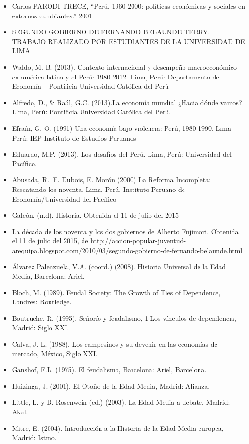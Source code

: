 \documentclass[
  letterpaper,
  DIV=11,
  numbers=noendperiod]{scrartcl}
\providecommand{\tightlist}{%
  \setlength{\itemsep}{0pt}\setlength{\parskip}{0pt}}\usepackage{longtable,booktabs,array}
\begin{document}
\begin{itemize}
\tightlist
\item
  Carlos PARODI TRECE, ``Perú, 1960-2000: políticas económicas y
  sociales en entornos cambiantes.'' 2001
\item
  SEGUNDO GOBIERNO DE FERNANDO BELAUNDE TERRY: TRABAJO REALIZADO POR
  ESTUDIANTES DE LA UNIVERSIDAD DE LIMA
\item
  Waldo, M. B. (2013). Contexto internacional y desempeño macroeconómico
  en américa latina y el Perú: 1980-2012. Lima, Perú: Departamento de
  Economía -- Pontificia Universidad Católica del Perú
\item
  Alfredo, D., \& Raúl, G.C. (2013).La economía mundial ¿Hacia dónde
  vamos? Lima, Perú: Pontificia Universidad Católica del Perú.
\item
  Efraín, G. O. (1991) Una economía bajo violencia: Perú, 1980-1990.
  Lima, Perú: IEP Instituto de Estudios Peruanos
\item
  Eduardo, M.P. (2013). Los desafíos del Perú. Lima, Perú: Universidad
  del Pacífico.
\item
  Abusada, R., F. Dubois, E. Morón (2000) La Reforma Incompleta:
  Rescatando los noventa. Lima, Perú. Instituto Peruano de
  Economía/Universidad del Pacífico
\item
  Galeón. (n.d). Historia. Obtenida el 11 de julio del 2015
\item
  La década de los noventa y los dos gobiernos de Alberto Fujimori.
  Obtenida el 11 de julio del 2015, de
  http://accion-popular-juventud-arequipa.blogspot.com/2010/03/segundo-gobierno-de-fernando-belaunde.html
\item
  Álvarez Palenzuela, V.A. (coord.) (2008). Historia Universal de la
  Edad Media, Barcelona: Ariel.
\item
  Bloch, M. (1989). Feudal Society: The Growth of Ties of Dependence,
  Londres: Routledge.
\item
  Boutruche, R. (1995). Señorío y feudalismo, 1.Los vínculos de
  dependencia, Madrid: Siglo XXI.
\item
  Calva, J. L. (1988). Los campesinos y su devenir en las economías de
  mercado, México, Siglo XXI.
\item
  Ganshof, F.L. (1975). El feudalismo, Barcelona: Ariel, Barcelona.
\item
  Huizinga, J. (2001). El Otoño de la Edad Media, Madrid: Alianza.
\item
  Little, L. y B. Rosenwein (ed.) (2003). La Edad Media a debate,
  Madrid: Akal.
\item
  Mitre, E. (2004). Introducción a la Historia de la Edad Media europea,
  Madrid: Istmo.
\end{itemize}


\printbibliography
\end{document}

